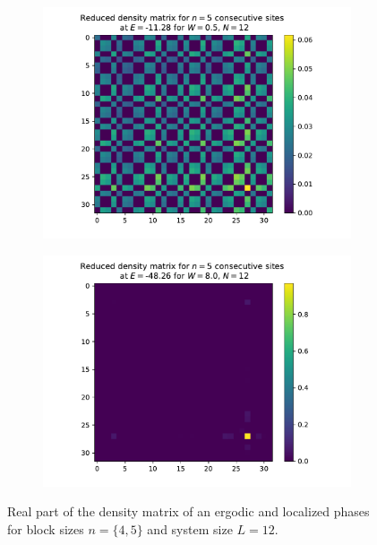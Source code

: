 \documentclass[reprint,amsmath,amssymb,aps,prb]{revtex4-2}
\begin{document}
\begin{center}
\begin{figure}[H]
\begin{subfigure}[c]{0.45\textwidth}
	\end{subfigure}
	\begin{subfigure}[c]{0.45\textwidth}
		\includegraphics[width=\textwidth]{../results/groundstates/N12n5_trainingset_groundstate_Wmax0.5.pdf}
	\end{subfigure}
	\begin{subfigure}[c]{0.45\textwidth}
		\includegraphics[width=\textwidth]{../results/groundstates/N12n5_trainingset_groundstate_Wmax8.0.pdf}
	\end{subfigure}
	\caption{Real part of the density matrix of an ergodic and localized phases for block sizes $n=\{4, 5\}$ and system size $L=12$.}
	\label{fig:groundstate}
\end{figure}
\end{center}
\end{document}
